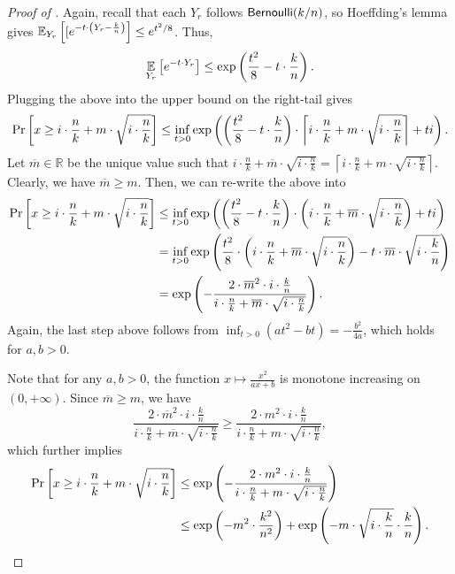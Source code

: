 \begin{proof}[Proof of ]
Again, recall that each $Y_r$ follows $\mathsf{Bernoulli}(k/n)$, so Hoeffding's lemma gives $\operatorname*{\mathbb{E}}_{Y_r}\left[[e^{-t\cdot \left(Y_r - \frac{k}{n}\right)}\right] \le e^{t^2/8}$. Thus,
\[
    \operatorname*{\mathbb{E}}_{Y_r}\left[e^{-t\cdot Y_r}\right] \le \exp\left(\frac{t^2}{8} - t\cdot \frac{k}{n}\right).
\]
Plugging the above into the upper bound on the right-tail gives
\[
    \Pr_{}\left[x \ge i\cdot\frac{n}{k} + m\cdot\sqrt{i \cdot\frac{n}{k}}\right]
\le \inf_{t>0}\exp\left(\left(\frac{t^2}{8} - t\cdot \frac{k}{n}\right)\cdot \left\lceil i\cdot \frac{n}{k} + m\cdot \sqrt{i\cdot \frac{n}{k}}\right\rceil + ti\right).
\]
Let $\overline{m} \in \mathbb{R}$ be the unique value such that $i \cdot \frac{n}{k} + \overline{m}\cdot\sqrt{i \cdot \frac{n}{k}} = \left\lceil i\cdot \frac{n}{k} + m\cdot \sqrt{i\cdot \frac{n}{k}}\right\rceil$. Clearly, we have $\overline{m} \ge m$. Then, we can re-write the above into
\begin{align*}
        \Pr_{}\left[x \ge i\cdot\frac{n}{k} + m\cdot\sqrt{i \cdot\frac{n}{k}}\right]
&\le    \inf_{t>0}\exp\left(\left(\frac{t^2}{8} - t\cdot \frac{k}{n}\right)\cdot \left( i\cdot \frac{n}{k} + \overline{m}\cdot \sqrt{i\cdot \frac{n}{k}}\right) + ti\right)\\
&=      \inf_{t>0}\exp\left(\frac{t^2}{8}\cdot \left( i\cdot \frac{n}{k} + \overline{m}\cdot \sqrt{i\cdot \frac{n}{k}}\right) - t \cdot \overline{m} \cdot \sqrt{i \cdot \frac{k}{n}}\right)\\
&=      \exp\left(-\frac{2\cdot  \overline{m}^2\cdot i\cdot \frac{k}{n}}{i\cdot \frac{n}{k} + \overline{m}\cdot \sqrt{i\cdot \frac{n}{k}}}\right).
\end{align*}
Again, the last step above follows from $\inf_{t > 0}(at^2 - bt) = -\frac{b^2}{4a}$, which holds for $a, b > 0$.

Note that for any $a, b > 0$, the function $x \mapsto \frac{x^2}{ax + b}$ is monotone increasing on $(0, +\infty)$. Since $\overline{m} \ge m$, we have
\[
    \frac{2\cdot  \overline{m}^2\cdot i\cdot \frac{k}{n}}{i\cdot \frac{n}{k} + \overline{m}\cdot \sqrt{i\cdot \frac{n}{k}}}
\ge \frac{2\cdot  m^2\cdot i\cdot \frac{k}{n}}{i\cdot \frac{n}{k} + m\cdot \sqrt{i\cdot \frac{n}{k}}},
\]
which further implies
\begin{align*}
        \Pr_{}\left[x \ge i\cdot\frac{n}{k} + m\cdot\sqrt{i \cdot\frac{n}{k}}\right]
&\le    \exp\left(-\frac{2\cdot  m^2\cdot i\cdot \frac{k}{n}}{i\cdot \frac{n}{k} + m\cdot \sqrt{i\cdot \frac{n}{k}}}\right)\\
&\le    \exp\left(-m^2\cdot \frac{k^2}{n^2}\right) + \exp\left(-m\cdot \sqrt{i\cdot \frac{k}{n}}\cdot \frac{k}{n}\right).
\end{align*}


\end{proof}
